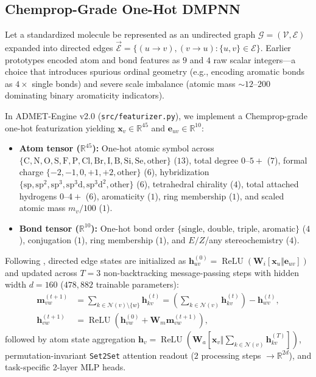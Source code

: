 \documentclass[10pt,twocolumn,letterpaper]{article}
\begin{document}
\subsection{Chemprop-Grade One-Hot DMPNN}
Let a standardized molecule be represented as an undirected graph $\mathcal{G} = (\mathcal{V}, \mathcal{E})$ expanded into directed edges $\vec{\mathcal{E}} = \{(u\!\to\!v), (v\!\to\!u) : \{u,v\} \in \mathcal{E}\}$. Earlier prototypes encoded atom and bond features as $9$ and $4$ raw scalar integers—a choice that introduces spurious ordinal geometry (e.g., encoding aromatic bonds as $4\times$ single bonds) and severe scale imbalance (atomic mass $\sim 12$–$200$ dominating binary aromaticity indicators).

In ADMET-Engine v2.0 (\texttt{src/featurizer.py}), we implement a Chemprop-grade one-hot featurization yielding $\mathbf{x}_v \in \mathbb{R}^{45}$ and $\mathbf{e}_{uv} \in \mathbb{R}^{10}$:
\begin{itemize}
  \item \textbf{Atom tensor ($\mathbb{R}^{45}$):} One-hot atomic symbol across $\{\mathrm{C,N,O,S,F,P,Cl,Br,I,B,Si,Se,other}\}$ ($13$), total degree $0$–$5+$ ($7$), formal charge $\{-2,-1,0,+1,+2,\text{other}\}$ ($6$), hybridization $\{\mathrm{sp,sp^2,sp^3,sp^3d,sp^3d^2,other}\}$ ($6$), tetrahedral chirality ($4$), total attached hydrogens $0$–$4+$ ($6$), aromaticity ($1$), ring membership ($1$), and scaled atomic mass $m_v / 100$ ($1$).
  \item \textbf{Bond tensor ($\mathbb{R}^{10}$):} One-hot bond order $\{\text{single, double, triple, aromatic}\}$ ($4$), conjugation ($1$), ring membership ($1$), and $E/Z$/any stereochemistry ($4$).
\end{itemize}

Following \citet{yang2019analyzing}, directed edge states are initialized as $\mathbf{h}_{uv}^{(0)} = \operatorname{ReLU}(\mathbf{W}_i [\mathbf{x}_u \Vert \mathbf{e}_{uv}])$ and updated across $T = 3$ non-backtracking message-passing steps with hidden width $d = 160$ ($478{,}882$ trainable parameters):
\begin{align}
  \mathbf{m}_{vw}^{(t+1)} &= \sum_{k \in \mathcal{N}(v) \setminus \{w\}} \mathbf{h}_{kv}^{(t)}
  = \left(\sum_{k \in \mathcal{N}(v)} \mathbf{h}_{kv}^{(t)}\right) - \mathbf{h}_{wv}^{(t)}, \label{eq:dmpnn_msg}\\
  \mathbf{h}_{vw}^{(t+1)} &= \operatorname{ReLU}\!\left(\mathbf{h}_{vw}^{(0)} + \mathbf{W}_m \mathbf{m}_{vw}^{(t+1)}\right), \label{eq:dmpnn_upd}
\end{align}
followed by atom state aggregation $\mathbf{h}_v = \operatorname{ReLU}(\mathbf{W}_a [\mathbf{x}_v \Vert \sum_{k \in \mathcal{N}(v)} \mathbf{h}_{kv}^{(T)}])$, permutation-invariant \texttt{Set2Set} attention readout \citep{vinyals2016order} ($2$ processing steps $\to \mathbb{R}^{2d}$), and task-specific 2-layer \textsc{MLP} heads.
\end{document}
